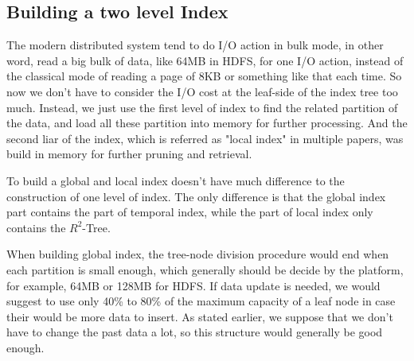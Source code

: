 \documentclass[sigplan]{acmart}
\begin{document}
\subsection{Building a two level Index}
The modern distributed system tend to do I/O action in bulk mode, in other word, read a big bulk of data, like 64MB in HDFS, for one I/O action, instead of the classical mode of reading a page of 8KB or something like that each time. So now we don't have to consider the I/O cost at the leaf-side of the index tree too much. Instead, we just use the first level of index to find the related partition of the data, and load all these partition into memory for further processing. And the second liar of the index, which is referred as "local index" in multiple papers, was build in memory for further pruning and retrieval. \par
To build a global and local index doesn't have much difference to the construction of one level of index. The only difference is that the global index part contains the part of temporal index, while the part of local index only contains the $R^2$-Tree.\par
When building global index, the tree-node division procedure would end when each partition is small enough, which generally should be decide by the platform, for example, 64MB or 128MB for HDFS. If data update is needed, we would suggest to use only 40\% to 80\% of the maximum capacity of a leaf node in case their would be more data to insert. As stated earlier, we suppose that we don't have to change the past data a lot, so this structure would generally be good enough. \par
\end{document}
